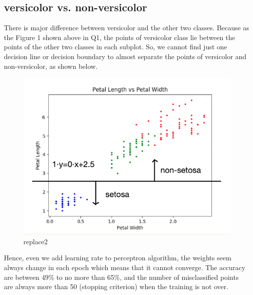 \documentclass{article}
\begin{document}
\subsection{versicolor vs. non-versicolor}                                                                                                                                                                                                                                                           
There is major difference between versicolor and the other two classes. Because as the Figure 1 shown above in Q1, the points of versicolor class lie between the points of the other two classes in each subplot. So, we cannot find just one decision line or decision boundary to almost separate the points of versicolor and non-versicolor, as shown below.\\
\begin{figure}[H]
\centering
\includegraphics[scale=0.4]{PLvsPW.png}
\caption{replace2}
\end{figure}
\noindent
Hence, even we add learning rate to perceptron algorithm, the weights seem always change in each epoch which means that it cannot converge. The accuracy are between 49\% to no more than 65\%, and the number of misclassified points are always more than 50 (stopping criterion) when the training is not over.
\end{document}

